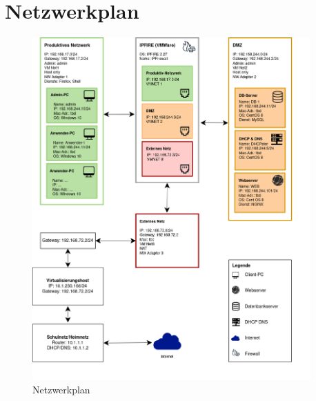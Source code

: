 \documentclass[a4paper,12pt,headings=small,ngerman,bibliography=totoc]{scrartcl}
\begin{document}
\section{Netzwerkplan}

\begin{figure}[h!]
  \centering
  \includegraphics[width=0.95\textwidth]{data/Netzwerkplan.png}
  \caption{Netzwerkplan}
  \label{app:Netzwerkplan}
\end{figure}
\end{document}
